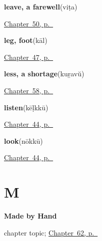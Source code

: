 \noindent\begin{minipage}[t]{\linewidth}
\raggedright
\textbf{leave, a farewell}\enspace\emph{}\enspace(viṭa)\par
\footnotesize \hyperref[ch:ml-taking-leave]{Chapter~50, p.~\pageref*{ch:ml-taking-leave}}
\end{minipage}\par\smallskip

\noindent\begin{minipage}[t]{\linewidth}
\raggedright
\textbf{leg, foot}\enspace\emph{}\enspace(kāl)\par
\footnotesize \hyperref[ch:ml-body-more]{Chapter~47, p.~\pageref*{ch:ml-body-more}}
\end{minipage}\par\smallskip

\noindent\begin{minipage}[t]{\linewidth}
\raggedright
\textbf{less, a shortage}\enspace\emph{}\enspace(kuṟavŭ)\par
\footnotesize \hyperref[ch:ml-five-more-short-answers]{Chapter~58, p.~\pageref*{ch:ml-five-more-short-answers}}
\end{minipage}\par\smallskip

\noindent\begin{minipage}[t]{\linewidth}
\raggedright
\textbf{listen}\enspace\emph{}\enspace(kēḷkkū)\par
\footnotesize \hyperref[ch:ml-see-say]{Chapter~44, p.~\pageref*{ch:ml-see-say}}
\end{minipage}\par\smallskip

\noindent\begin{minipage}[t]{\linewidth}
\raggedright
\textbf{look}\enspace\emph{}\enspace(nōkkū)\par
\footnotesize \hyperref[ch:ml-see-say]{Chapter~44, p.~\pageref*{ch:ml-see-say}}
\end{minipage}\par\smallskip

\section*{M}

\noindent\begin{minipage}[t]{\linewidth}
\raggedright
\textbf{Made by Hand}\par
\footnotesize chapter topic; \hyperref[ch:ml-made-by-hand]{Chapter~62, p.~\pageref*{ch:ml-made-by-hand}}
\end{minipage}\par\smallskip

